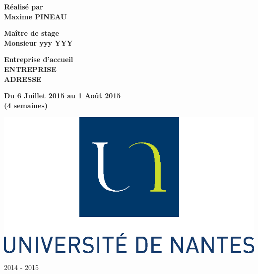 \begin{titlepage}
\begin{center}

\Large{\textbf{Réalisé par}} \\
\Large{\textbf{Maxime PINEAU}} 

\vfill 



\Large{\textbf{Maître de stage}} \\
\Large{\textbf{Monsieur yyy YYY}} 

\vfill


\Large{\textbf{Entreprise d'accueil}} \\
\LARGE{\textbf{ENTREPRISE} }\\
\Large{\textbf{ADRESSE}} 

\vfill

\Large{\textbf{Du 6 Juillet 2015 au 1 Août 2015\\(4 semaines)}} 

\vfill


\includegraphics[scale=0.8]{images/logo_ecoles/Universite_de_Nantes_} 

\vfill

\large{2014 - 2015} 

\vfill




\end{center}

\end{titlepage}